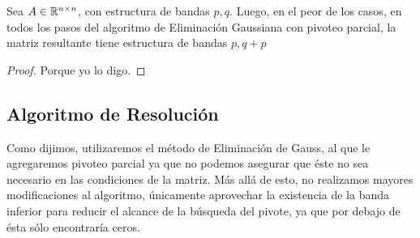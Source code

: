 \begin{lema}
Sea $A \in \mathbb{R}^{n \times n}$, con estructura de bandas $p, q$. Luego, en el peor de los casos, en todos los pasos del algoritmo de Eliminación Gaussiana con pivoteo parcial, la matriz resultante tiene estructura de bandas $p, q+p$
\end{lema}
\begin{proof}
Porque yo lo digo.
\end{proof}

\subsection{Algoritmo de Resolución}
Como dijimos, utilizaremos el método de Eliminación de Gauss, al que le agregaremos pivoteo parcial  ya que no podemos asegurar que éste no sea necesario en las condiciones de la matriz. Más allá de esto, no realizamos mayores modificaciones al algoritmo, únicamente aprovechar la existencia de la banda inferior para reducir el alcance de la búsqueda del pivote, ya que por debajo de ésta sólo encontraría ceros.




